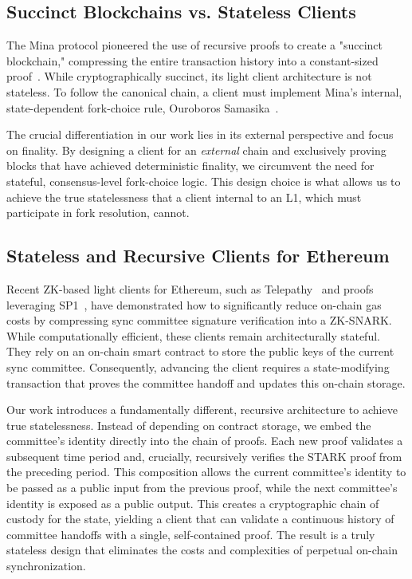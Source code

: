 \documentclass[runningheads]{llncs}
\begin{document}
\subsection{Succinct Blockchains vs. Stateless Clients}
The Mina protocol pioneered the use of recursive proofs to create a "succinct blockchain," compressing the entire transaction history into a constant-sized proof~\cite{Bonneau2020Coda}. While cryptographically succinct, its light client architecture is not stateless. To follow the canonical chain, a client must implement Mina's internal, state-dependent fork-choice rule, Ouroboros Samasika~\cite{Badertscher2018Samasika}.

The crucial differentiation in our work lies in its external perspective and focus on finality. By designing a client for an \textit{external} chain and exclusively proving blocks that have achieved deterministic finality, we circumvent the need for stateful, consensus-level fork-choice logic. This design choice is what allows us to achieve the true statelessness that a client internal to an L1, which must participate in fork resolution, cannot.

\subsection{Stateless and Recursive Clients for Ethereum}
Recent ZK-based light clients for Ethereum, such as Telepathy~\cite{Succinct2023Telepathy} and proofs leveraging SP1~\cite{Succinct2025SP1}, have demonstrated how to significantly reduce on-chain gas costs by compressing sync committee signature verification into a ZK-SNARK. While computationally efficient, these clients remain architecturally stateful. They rely on an on-chain smart contract to store the public keys of the current sync committee. Consequently, advancing the client requires a state-modifying transaction that proves the committee handoff and updates this on-chain storage.

Our work introduces a fundamentally different, recursive architecture to achieve true statelessness. Instead of depending on contract storage, we embed the committee's identity directly into the chain of proofs. Each new proof validates a subsequent time period and, crucially, recursively verifies the STARK proof from the preceding period. This composition allows the current committee's identity to be passed as a public input from the previous proof, while the next committee's identity is exposed as a public output. This creates a cryptographic chain of custody for the state, yielding a client that can validate a continuous history of committee handoffs with a single, self-contained proof. The result is a truly stateless design that eliminates the costs and complexities of perpetual on-chain synchronization.
\end{document}
